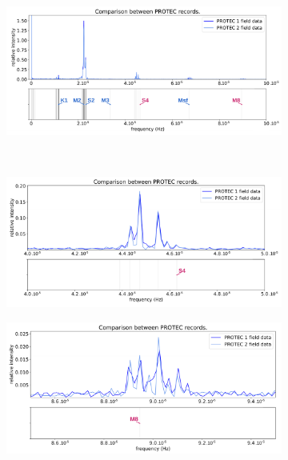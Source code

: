 \documentclass[10pt,a4paper,titlepage]{article}
\begin{document}
\begin{figure}[H]
    \centering
    \begin{subfigure}{1.\linewidth}
        \centering
        \includegraphics[scale=0.4]{../images/post_traitement/PROTEC1_PROTEC2_analyse.pdf}
        \caption{}
    \end{subfigure}
    \\
    \begin{subfigure}{0.45\linewidth}
        \centering
        \includegraphics[width=\linewidth]{../images/post_traitement/PROTEC1_PROTEC2_analyse_zoom2.pdf}
        \caption{}
    \end{subfigure}
    \begin{subfigure}{0.45\linewidth}
        \centering
        \includegraphics[width=\linewidth]{../images/post_traitement/PROTEC1_PROTEC2_analyse_zoom3.pdf}

\end{subfigure}
\end{figure}
\end{document}
